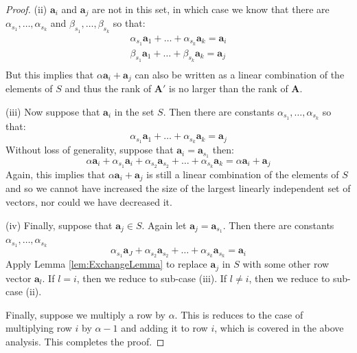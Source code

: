 \begin{proof}
(ii) $\mathbf{a}_i$ and $\mathbf{a}_j$ are not in this set, in which case we know that there are $\alpha_{s_1}, \dots, \alpha_{s_k}$ and $\beta_{s_1}, \dots, \beta_{s_k}$ so that:
\begin{gather*}
\alpha_{s_1}\mathbf{a}_1 + \dots + \alpha_{s_k}\mathbf{a}_k = \mathbf{a}_i\\
\beta_{s_1}\mathbf{a}_1 + \dots + \beta_{s_k}\mathbf{a}_k = \mathbf{a}_j\\
\end{gather*}
But this implies that $\alpha\mathbf{a}_i + \mathbf{a}_j$ can also be written as a linear combination of the elements of $S$ and thus the rank of $\mathbf{A}'$ is no larger than the rank of $\mathbf{A}$. 

(iii) Now suppose that $\mathbf{a}_i$ in the set $S$. Then there are constants $\alpha_{s_1}, \dots, \alpha_{s_k}$ so that:
\begin{displaymath}
\alpha_{s_1}\mathbf{a}_1 + \dots + \alpha_{s_k}\mathbf{a}_k = \mathbf{a}_j
\end{displaymath}
Without loss of generality, suppose that $\mathbf{a}_i = \mathbf{a}_{s_1}$ then:
\begin{displaymath}
\alpha\mathbf{a}_i + \alpha_{s_1}\mathbf{a}_i + \alpha_{s_2}\mathbf{a}_{s_2} + \dots + \alpha_{s_k}\mathbf{a}_k = \alpha\mathbf{a}_i + \mathbf{a}_j
\end{displaymath}
Again, this implies that $\alpha\mathbf{a}_i + \mathbf{a}_j$ is still a linear combination of the elements of $S$ and so we cannot have increased the size of the largest linearly independent set of vectors, nor could we have decreased it. 

(iv) Finally, suppose that $\mathbf{a}_j \in S$. Again let $\mathbf{a}_j = \mathbf{a}_{s_1}$. Then there are constants $\alpha_{s_1}, \dots, \alpha_{s_k}$
\begin{displaymath}
\alpha_{s_1}\mathbf{a}_J + \alpha_{s_2} \mathbf{a}_{s_2} + \dots + \alpha_{s_k}\mathbf{a}_{s_k} = \mathbf{a}_i
\end{displaymath}
Apply Lemma \ref{lem:ExchangeLemma} to replace $\mathbf{a}_j$ in $S$ with some other row vector $\mathbf{a}_l$. If $l = i$, then we reduce to sub-case (iii). If $l \neq i$, then we reduce to sub-case (ii).

Finally, suppose we multiply a row by $\alpha$. This is reduces to the case of multiplying row $i$ by $\alpha - 1$ and adding it to row $i$, which is covered in the above analysis. This completes the proof.
\end{proof}


